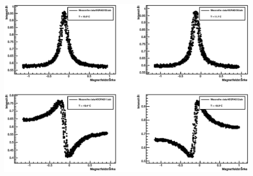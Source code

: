 \documentclass[12pt]{article}
\begin{document}
\includegraphics[width=1\linewidth]{pictures/19.eps} \\
\end{document}
